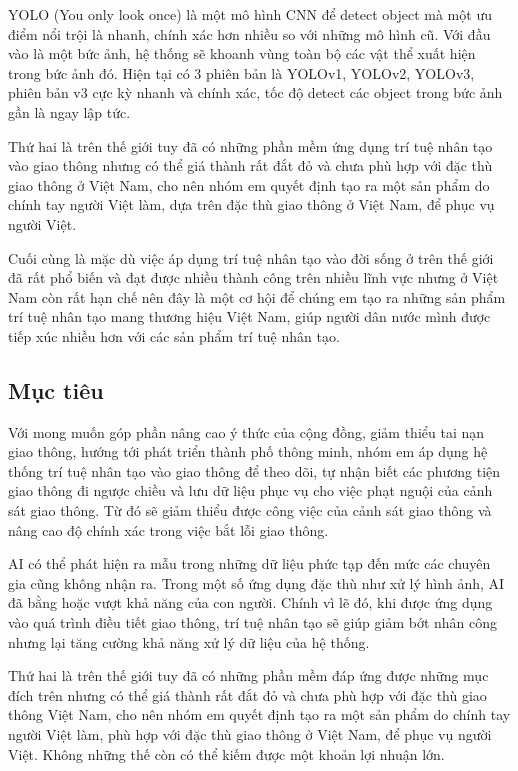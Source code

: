 \documentclass[14pt,oneside,a4paper]{extreport}
\begin{document}
YOLO (You only look once) là một mô hình CNN để detect object mà một ưu điểm nổi trội là nhanh, chính xác hơn nhiều so với những mô hình cũ. Với đầu vào là một bức ảnh, hệ thống sẽ khoanh vùng toàn bộ các vật thể xuất hiện trong bức ảnh đó. Hiện tại có 3 phiên bản là YOLOv1, YOLOv2, YOLOv3, phiên bản v3 cực kỳ nhanh và chính xác, tốc độ detect các object trong bức ảnh gần là ngay lập tức.

Thứ hai là trên thế giới tuy đã có những phần mềm ứng dụng trí tuệ nhân tạo vào giao thông nhưng có thể giá thành rất đắt đỏ và chưa phù hợp với đặc thù giao thông ở Việt Nam, cho nên nhóm em quyết định tạo ra một sản phẩm do chính tay người Việt làm, dựa trên đặc thù giao thông ở Việt Nam, để phục vụ người Việt.

Cuối cùng là mặc dù việc áp dụng trí tuệ nhân tạo vào đời sống ở trên thế giới đã rất phổ biến và đạt được nhiều thành công trên nhiều lĩnh vực nhưng ở Việt Nam còn rất hạn chế nên đây là một cơ hội để chúng em tạo ra những sản phẩm trí tuệ nhân tạo mang thương hiệu Việt Nam, giúp người dân nước mình được tiếp xúc nhiều hơn với các sản phẩm trí tuệ nhân tạo.

\subsection{Mục tiêu}
Với mong muốn góp phần nâng cao ý thức của cộng đồng, giảm thiểu tai nạn giao thông, hướng tới phát triển thành phố thông minh, nhóm em áp dụng hệ thống trí tuệ nhân tạo vào giao thông để theo dõi, tự nhận biết các phương tiện giao thông đi ngược chiều và lưu dữ liệu phục vụ cho việc phạt nguội của cảnh sát giao thông. Từ đó sẽ giảm thiểu được công việc của cảnh sát giao thông và nâng cao độ chính xác trong việc bắt lỗi giao thông.

AI có thể phát hiện ra mẫu trong những dữ liệu phức tạp đến mức các chuyên gia cũng không nhận ra. Trong một số ứng dụng đặc thù như xử lý hình ảnh, AI đã bằng hoặc vượt khả năng của con người. Chính vì lẽ đó, khi được ứng dụng vào quá trình điều tiết giao thông, trí tuệ nhân tạo sẽ giúp giảm bớt nhân công nhưng lại tăng cường khả năng xử lý dữ liệu của hệ thống.

Thứ hai là trên thế giới tuy đã có những phần mềm đáp ứng được những mục đích trên nhưng có thể giá thành rất đắt đỏ và chưa phù hợp với đặc thù giao thông Việt Nam, cho nên nhóm em quyết định tạo ra một sản phẩm do chính tay người Việt làm, phù hợp với đặc thù giao thông ở Việt Nam, để phục vụ người Việt. Không những thế còn có thể kiếm được một khoản lợi nhuận lớn.
\end{document}
